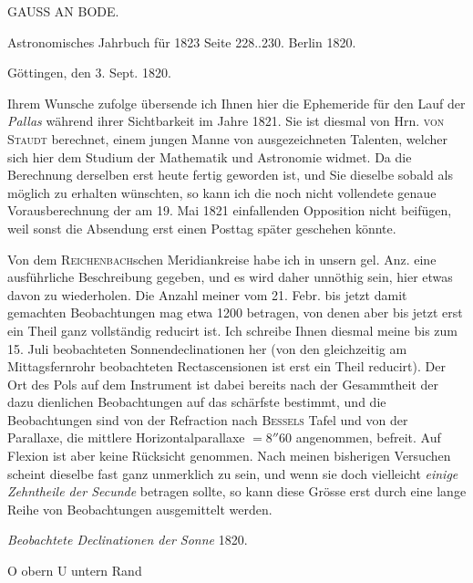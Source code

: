 \clearpage
{}
\hypertarget{native-438-part-lower}{}
\begin{center}
{\large GAUSS AN BODE.}

Astronomisches Jahrbuch für 1823 Seite 228..230. Berlin 1820.
\end{center}

\hfill Göttingen, den 3. Sept. 1820.

\par\indent Ihrem Wunsche zufolge übersende ich Ihnen hier die Ephemeride für den Lauf der
\emph{Pallas} während ihrer Sichtbarkeit im Jahre 1821. Sie ist diesmal von Hrn. \textsc{von Staudt} berechnet, einem jungen Manne von ausgezeichneten Talenten, welcher sich
hier dem Studium der Mathematik und Astronomie widmet. Da die Berechnung derselben erst
heute fertig geworden ist, und Sie dieselbe sobald als möglich zu erhalten wünschten, so
kann ich die noch nicht vollendete genaue Vorausberechnung der am 19. Mai 1821
einfallenden Opposition nicht beifügen, weil sonst die Absendung erst einen Posttag
später geschehen könnte.

Von dem \textsc{Reichenbach}schen Meridiankreise habe ich in unsern gel. Anz. eine
ausführliche Beschreibung gegeben, und es wird daher unnöthig sein, hier etwas davon zu
wiederholen. Die Anzahl meiner vom 21. Febr. bis jetzt damit gemachten Beobachtungen mag
etwa 1200 betragen, von denen aber bis jetzt erst ein Theil ganz vollständig reducirt
ist. Ich schreibe Ihnen diesmal meine bis zum 15. Juli beobachteten
Sonnendeclinationen her (von den gleichzeitig am Mittagsfernrohr beobachteten
Rectascensionen ist erst ein Theil reducirt). Der Ort des Pols auf dem Instrument ist
dabei bereits nach der Gesammtheit der dazu dienlichen Beobachtungen auf das schärfste
bestimmt, und die Beobachtungen sind von der Refraction nach \textsc{Bessels} Tafel und
von der Parallaxe, die mittlere Horizontalparallaxe $=8''60$ angenommen, befreit. Auf
Flexion ist aber keine Rücksicht genommen. Nach meinen bisherigen Versuchen scheint
dieselbe fast ganz unmerklich zu sein, und wenn sie doch vielleicht \emph{einige
Zehntheile der Secunde} betragen sollte, so kann diese Grösse erst durch eine lange
Reihe von Beobachtungen ausgemittelt werden.


\begin{center}
\emph{Beobachtete Declinationen der Sonne} 1820.

O obern \quad U untern Rand
\end{center}

